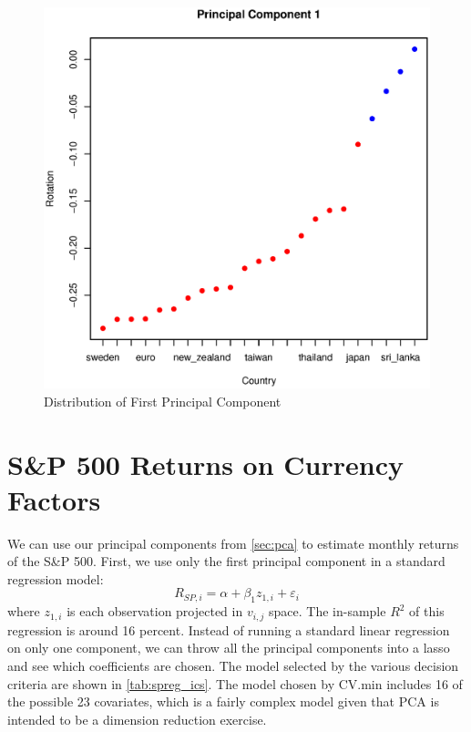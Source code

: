 \documentclass[11pt, fleqn]{article}
\begin{document}
\begin{figure}[!htb]
  \centering
  \includegraphics[scale=.5]{pc1_pegs.eps}
  \caption{Distribution of First Principal Component}
  \label{fig:pc1_pegs}
\end{figure} 

\section{S\&P 500 Returns on Currency Factors} \label{sec:sp500}

We can use our principal components from \cref{sec:pca} to estimate monthly returns of the S\&P 500. First, we use only the first principal component in a standard regression model:
\begin{equation}
R_{SP,i} = \alpha + \beta_1 z_{1,i} + \varepsilon_{i}
\end{equation}
where $z_{1,i}$ is each observation projected in $v_{i,j}$ space. The in-sample $R^2$ of this regression is around 16 percent. Instead of running a standard linear regression on only one component, we can throw all the principal components into a lasso and see which coefficients are chosen. The model selected by the various decision criteria are shown in \cref{tab:spreg_ics}. The model chosen by CV.min includes 16 of the possible 23 covariates, which is a fairly complex model given that PCA is intended to be a dimension reduction exercise. 
\end{document}

